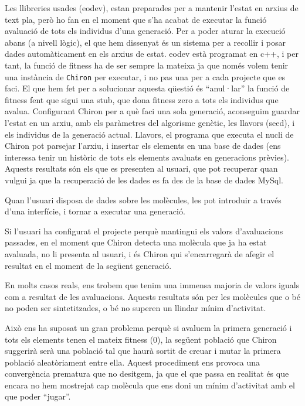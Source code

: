 Les llibreries usades (eodev), estan preparades per a mantenir l'estat en arxius
de text pla, però ho fan en el moment que s'ha acabat de executar la funció
avaluació de tots els individus d'una generació.  Per a poder aturar la
execució abans (a nivell lògic), el que hem dissenyat és un sistema per a
recollir i posar dades automàticament en els arxius de estat.  eodev està
programat en c++, i per tant, la funció de fitness ha de ser sempre la mateixa
ja que només volem tenir una instància de \texttt{Chiron} per executar, i no pas
una per a cada projecte que es faci.  El que hem fet per a solucionar aquesta
qüestió és ``anul·lar'' la funció de fitness fent que sigui una stub, que dona
fitness zero a tots els individus que avalua.  Configurant Chiron per a què
faci una sola generació, aconseguim guardar l'estat en un arxiu, amb els
paràmetres del algorisme genètic, les llavors (seed), i els individus de la
generació actual.  Llavors, el programa que executa el nucli de Chiron pot
parsejar l'arxiu, i insertar els elements en una base de dades (ens interessa
tenir un històric de tots els elements avaluats en generacions prèvies).
Aquests resultats són els que es presenten al usuari, que pot recuperar quan
vulgui ja que la recuperació de les dades es fa des de la base de dades MySql.

Quan l'usuari disposa de dades sobre les molècules, les pot introduir a través
d'una interfície, i tornar a executar una generació.

Si l'usuari ha configurat el projecte perquè mantingui els valors d'avaluacions
passades, en el moment que Chiron detecta una molècula que ja ha estat avaluada,
no li presenta al usuari, i és Chiron qui s'encarregarà de afegir el resultat en
el moment de la següent generació.


En  molts casos reals, ens trobem que tenim una immensa majoria de valors iguals
com a resultat de les avaluacions.  Aquests resultats són per les molècules que
o bé no poden ser sintetitzades, o bé no superen un llindar mínim d'activitat.

Això ens ha suposat un gran problema perquè si avaluem la primera generació i
tots els elements tenen el mateix fitness (0), la següent població que Chiron
suggerirà serà una població tal que haurà sortit de creuar i mutar la primera
població aleatòriament entre ella.  Aquest procediment ens provoca una
convergència prematura que no desitgem, ja que el que passa en realitat és que
encara no hem mostrejat cap molècula que ens doni un mínim d'activitat amb el
que poder ``jugar''.

